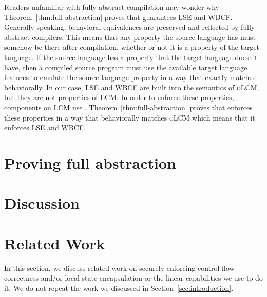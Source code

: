 \documentclass[acmsmall,screen]{acmart}\settopmatter{}
\newcommand{\trgcm}{\textsc{LCM}}
\newcommand{\srccm}{\textsc{oLCM}}
\begin{document}
Readers unfamiliar with fully-abstract compilation may wonder why Theorem~\ref{thm:full-abstraction} proves that \stktokens{} guarantees LSE and WBCF.
Generally speaking, behavioral equivalences are preserved and reflected by fully-abstract compilers.
This means that any property the source language has must somehow be there after compilation, whether or not it is a property of the target language.
If the source language has a property that the target language doesn't have, then a compiled source program must use the available target language features to emulate the source language property in a way that exactly matches behaviorally.
In our case, LSE and WBCF are built into the semantics of \srccm{}, but they are not properties of \trgcm{}.
In order to enforce these properties, components on \trgcm{} use \stktokens{}.
Theorem~\ref{thm:full-abstraction} proves that \stktokens{} enforces these properties in a way that behaviorally matches \srccm{} which means that it enforces LSE and WBCF.



\section{Proving full abstraction}
\label{sec:fa-proof}


\section{Discussion}
\label{sec:discussion}


\section{Related Work}
In this section, we discuss related work on securely enforcing control flow correctness and/or local state encapsulation or the linear capabilities we use to do it.
We do not repeat the work we discussed in Section~\ref{sec:introduction}.
\end{document}
